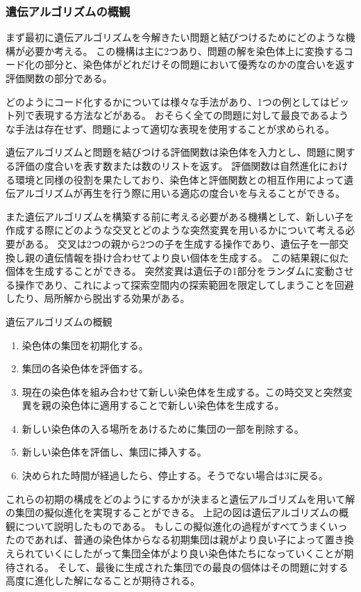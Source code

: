 \documentclass[titlepage]{jsarticle}
\begin{document}
\subsubsection{遺伝アルゴリズムの概観}

まず最初に遺伝アルゴリズムを今解きたい問題と結びつけるためにどのような機構が必要か考える。
この機構は主に2つあり、問題の解を染色体上に変換するコード化の部分と、染色体がどれだけその問題において優秀なのかの度合いを返す評価関数の部分である。

どのようにコード化するかについては様々な手法があり、1つの例としてはビット列で表現する方法などがある。
おそらく全ての問題に対して最良であるような手法は存在せず、問題によって適切な表現を使用することが求められる。

遺伝アルゴリズムと問題を結びつける評価関数は染色体を入力とし、問題に関する評価の度合いを表す数または数のリストを返す。
評価関数は自然進化における環境と同様の役割を果たしており、染色体と評価関数との相互作用によって遺伝アルゴリズムが再生を行う際に用いる適応の度合いを与えることができる。

また遺伝アルゴリズムを構築する前に考える必要がある機構として、新しい子を作成する際にどのような交叉とどのような突然変異を用いるかについて考える必要がある。
交叉は2つの親から2つの子を生成する操作であり、遺伝子を一部交換し親の遺伝情報を掛け合わせてより良い個体を生成する。
この結果親に似た個体を生成することができる。
突然変異は遺伝子の1部分をランダムに変動させる操作であり、これによって探索空間内の探索範囲を限定してしまうことを回避したり、局所解から脱出する効果がある。

\hfill \break
\begin{itembox}[c]{遺伝アルゴリズムの概観}
	\begin{enumerate}
		\item 染色体の集団を初期化する。
		\item 集団の各染色体を評価する。
		\item 現在の染色体を組み合わせて新しい染色体を生成する。この時交叉と突然変異を親の染色体に適用することで新しい染色体を生成する。
		\item 新しい染色体の入る場所をあけるために集団の一部を削除する。
		\item 新しい染色体を評価し、集団に挿入する。
		\item 決められた時間が経過したら、停止する。そうでない場合は3に戻る。
	\end{enumerate}
\end{itembox}
\hfill \break


これらの初期の構成をどのようにするかが決まると遺伝アルゴリズムを用いて解の集団の擬似進化を実現することができる。
上記の図は遺伝アルゴリズムの概観について説明したものである。
もしこの擬似進化の過程がすべてうまくいったのであれば、普通の染色体からなる初期集団は親がより良い子によって置き換えられていくにしたがって集団全体がより良い染色体たちになっていくことが期待される。
そして、最後に生成された集団での最良の個体はその問題に対する高度に進化した解になることが期待される。
\end{document}
